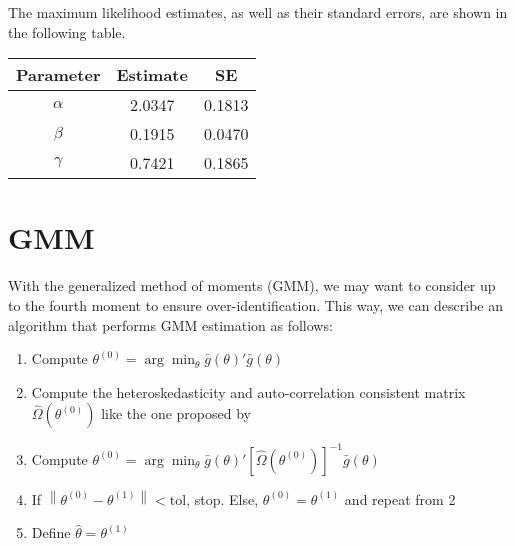 \documentclass[cm,linguex]{glossa}
\providecommand{\tightlist}{%
  \setlength{\itemsep}{0pt}\setlength{\parskip}{0pt}}
\begin{document}
The maximum likelihood estimates, as well as their standard errors, are
shown in the following table.

\begin{longtable}[]{@{}ccc@{}}
\toprule()
Parameter & Estimate & SE \\
\midrule()
\endhead
\(\alpha\) & 2.0347 & 0.1813 \\
\(\beta\) & 0.1915 & 0.0470 \\
\(\gamma\) & 0.7421 & 0.1865 \\
\bottomrule()
\end{longtable}

\newpage

\hypertarget{gmm}{%
\section{GMM}\label{gmm}}

With the generalized method of moments (GMM), we may want to consider up
to the fourth moment to ensure over-identification. This way, we can
describe an algorithm that performs GMM estimation as follows:

\begin{enumerate}
\def\labelenumi{\arabic{enumi}.}
\tightlist
\item
  Compute
  \(\theta^{(0)} = \arg\min_\theta \bar{g}(\theta)'\bar{g}(\theta)\)
\item
  Compute the heteroskedasticity and auto-correlation consistent matrix
  \(\hat{\Omega} \left(\theta^{(0)}\right)\) like the one proposed by
  \citet{HAC}
\item
  Compute
  \(\theta^{(0)} = \arg\min_\theta \bar{g}(\theta)'\left[\hat{\Omega} \left(\theta^{(0)}\right)\right]^{-1}\bar{g}(\theta)\)
\item
  If
  \(\left\lVert \theta^{(0)} - \theta^{(1)} \right\rVert < \text{tol}\),
  stop. Else, \(\theta^{(0)} = \theta^{(1)}\) and repeat from 2
\item
  Define \(\hat{\theta} = \theta^{(1)}\)
\end{enumerate}

\newpage


\end{document}
